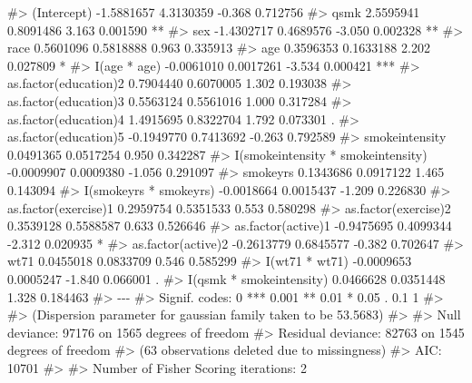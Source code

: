 \documentclass[
  10pt,
  a4paper,
]{book}
\newenvironment{Shaded}{\begin{snugshade}}{\end{snugshade}}
\newcommand{\CommentTok}[1]{\textcolor[rgb]{0.37,0.37,0.37}{#1}}
\begin{document}
\begin{Shaded}
\begin{Highlighting}[]
\CommentTok{\#\textgreater{} (Intercept)                        {-}1.5881657  4.3130359  {-}0.368 0.712756    }
\CommentTok{\#\textgreater{} qsmk                                2.5595941  0.8091486   3.163 0.001590 ** }
\CommentTok{\#\textgreater{} sex                                {-}1.4302717  0.4689576  {-}3.050 0.002328 ** }
\CommentTok{\#\textgreater{} race                                0.5601096  0.5818888   0.963 0.335913    }
\CommentTok{\#\textgreater{} age                                 0.3596353  0.1633188   2.202 0.027809 *  }
\CommentTok{\#\textgreater{} I(age * age)                       {-}0.0061010  0.0017261  {-}3.534 0.000421 ***}
\CommentTok{\#\textgreater{} as.factor(education)2               0.7904440  0.6070005   1.302 0.193038    }
\CommentTok{\#\textgreater{} as.factor(education)3               0.5563124  0.5561016   1.000 0.317284    }
\CommentTok{\#\textgreater{} as.factor(education)4               1.4915695  0.8322704   1.792 0.073301 .  }
\CommentTok{\#\textgreater{} as.factor(education)5              {-}0.1949770  0.7413692  {-}0.263 0.792589    }
\CommentTok{\#\textgreater{} smokeintensity                      0.0491365  0.0517254   0.950 0.342287    }
\CommentTok{\#\textgreater{} I(smokeintensity * smokeintensity) {-}0.0009907  0.0009380  {-}1.056 0.291097    }
\CommentTok{\#\textgreater{} smokeyrs                            0.1343686  0.0917122   1.465 0.143094    }
\CommentTok{\#\textgreater{} I(smokeyrs * smokeyrs)             {-}0.0018664  0.0015437  {-}1.209 0.226830    }
\CommentTok{\#\textgreater{} as.factor(exercise)1                0.2959754  0.5351533   0.553 0.580298    }
\CommentTok{\#\textgreater{} as.factor(exercise)2                0.3539128  0.5588587   0.633 0.526646    }
\CommentTok{\#\textgreater{} as.factor(active)1                 {-}0.9475695  0.4099344  {-}2.312 0.020935 *  }
\CommentTok{\#\textgreater{} as.factor(active)2                 {-}0.2613779  0.6845577  {-}0.382 0.702647    }
\CommentTok{\#\textgreater{} wt71                                0.0455018  0.0833709   0.546 0.585299    }
\CommentTok{\#\textgreater{} I(wt71 * wt71)                     {-}0.0009653  0.0005247  {-}1.840 0.066001 .  }
\CommentTok{\#\textgreater{} I(qsmk * smokeintensity)            0.0466628  0.0351448   1.328 0.184463    }
\CommentTok{\#\textgreater{} {-}{-}{-}}
\CommentTok{\#\textgreater{} Signif. codes:  0 \textquotesingle{}***\textquotesingle{} 0.001 \textquotesingle{}**\textquotesingle{} 0.01 \textquotesingle{}*\textquotesingle{} 0.05 \textquotesingle{}.\textquotesingle{} 0.1 \textquotesingle{} \textquotesingle{} 1}
\CommentTok{\#\textgreater{} }
\CommentTok{\#\textgreater{} (Dispersion parameter for gaussian family taken to be 53.5683)}
\CommentTok{\#\textgreater{} }
\CommentTok{\#\textgreater{}     Null deviance: 97176  on 1565  degrees of freedom}
\CommentTok{\#\textgreater{} Residual deviance: 82763  on 1545  degrees of freedom}
\CommentTok{\#\textgreater{}   (63 observations deleted due to missingness)}
\CommentTok{\#\textgreater{} AIC: 10701}
\CommentTok{\#\textgreater{} }
\CommentTok{\#\textgreater{} Number of Fisher Scoring iterations: 2}


\end{Highlighting}
\end{Shaded}
\end{document}
